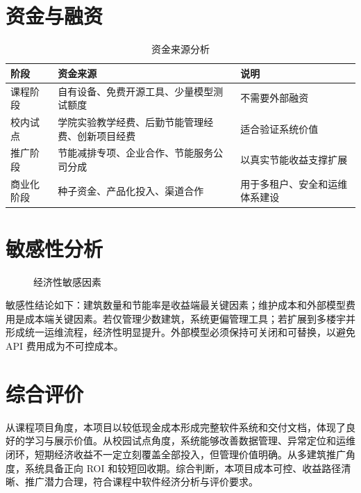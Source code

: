 \documentclass[12pt,a4paper]{ctexart}
\begin{document}
\section{资金与融资}
\begin{table}[H]
\centering
\caption{资金来源分析}
\begin{tabularx}{\textwidth}{p{3cm}YY}
\toprule
阶段 & 资金来源 & 说明 \\
\midrule
课程阶段 & 自有设备、免费开源工具、少量模型测试额度 & 不需要外部融资 \\
校内试点 & 学院实验教学经费、后勤节能管理经费、创新项目经费 & 适合验证系统价值 \\
推广阶段 & 节能减排专项、企业合作、节能服务公司分成 & 以真实节能收益支撑扩展 \\
商业化阶段 & 种子资金、产品化投入、渠道合作 & 用于多租户、安全和运维体系建设 \\
\bottomrule
\end{tabularx}
\end{table}

\section{敏感性分析}
\begin{figure}[H]
\centering
{}
\caption{经济性敏感因素}
\end{figure}

敏感性结论如下：建筑数量和节能率是收益端最关键因素；维护成本和外部模型费用是成本端关键因素。若仅管理少数建筑，系统更偏管理工具；若扩展到多楼宇并形成统一运维流程，经济性明显提升。外部模型必须保持可关闭和可替换，以避免 API 费用成为不可控成本。

\section{综合评价}
从课程项目角度，本项目以较低现金成本形成完整软件系统和交付文档，体现了良好的学习与展示价值。从校园试点角度，系统能够改善数据管理、异常定位和运维闭环，短期经济收益不一定立刻覆盖全部投入，但管理价值明确。从多建筑推广角度，系统具备正向 ROI 和较短回收期。综合判断，本项目成本可控、收益路径清晰、推广潜力合理，符合课程中软件经济分析与评价要求。
\end{document}
